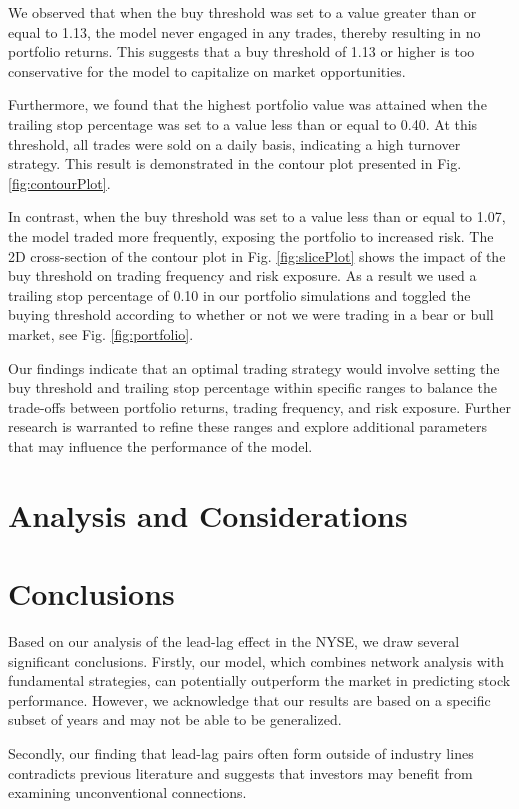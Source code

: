\documentclass{article}
\begin{document}
We observed that when the buy threshold was set to a value greater than or equal to 1.13, the model never engaged in any trades, thereby resulting in no portfolio returns. This suggests that a buy threshold of 1.13 or higher is too conservative for the model to capitalize on market opportunities.

Furthermore, we found that the highest portfolio value was attained when the trailing stop percentage was set to a value less than or equal to 0.40. At this threshold, all trades were sold on a daily basis, indicating a high turnover strategy. This result is demonstrated in the contour plot presented in Fig. \ref{fig:contourPlot}.

In contrast, when the buy threshold was set to a value less than or equal to 1.07, the model traded more frequently, exposing the portfolio to increased risk. The 2D cross-section of the contour plot in Fig. \ref{fig:slicePlot} shows the impact of the buy threshold on trading frequency and risk exposure. As a result we used a trailing stop percentage of 0.10 in our portfolio simulations and toggled the buying threshold according to whether or not we were trading in a bear or bull market, see Fig. \ref{fig:portfolio}.

Our findings indicate that an optimal trading strategy would involve setting the buy threshold and trailing stop percentage within specific ranges to balance the trade-offs between portfolio returns, trading frequency, and risk exposure. Further research is warranted to refine these ranges and explore additional parameters that may influence the performance of the model.
\section{Analysis and Considerations}
\section{Conclusions}
Based on our analysis of the lead-lag effect in the NYSE, we draw several significant conclusions. Firstly, our model, which combines network analysis with fundamental strategies, can potentially outperform the market in predicting stock performance. However, we acknowledge that our results are based on a specific subset of years and may not be able to be generalized. 

Secondly, our finding that lead-lag pairs often form outside of industry lines contradicts previous literature and suggests that investors may benefit from examining unconventional connections. 
\end{document}
